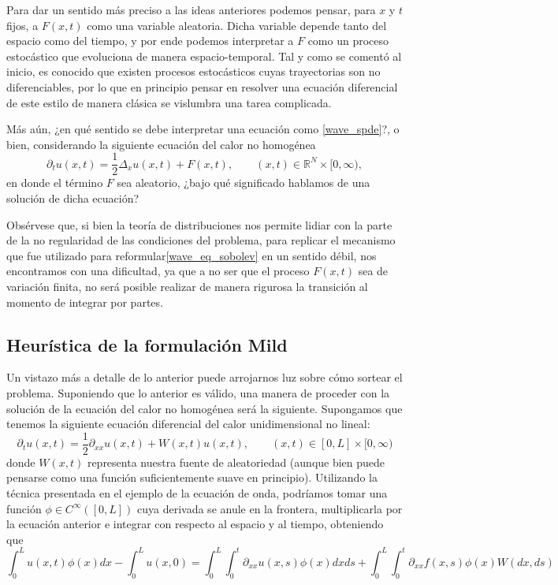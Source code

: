 \documentclass[letterpaper,twoside,12pt]{book}
\newcommand{\R}{\mathbb{R}}
\newcommand{\1}{\mathds{1}}
\theoremstyle{definition}
\theoremstyle{definition}
\theoremstyle{remark}
\theoremstyle{definition}
\theoremstyle{definition}
\theoremstyle{definition}
\theoremstyle{definition}
\theoremstyle{definition}
\begin{document}
Para dar un sentido más preciso a las ideas anteriores podemos pensar, para $x$ y $t$ fijos, a $F(x,t)$ como una variable aleatoria. Dicha variable depende tanto del espacio como del tiempo, y por ende podemos interpretar a $F$ como un proceso estocástico que evoluciona de manera espacio-temporal. Tal y como se comentó al inicio, es conocido que existen procesos estocásticos cuyas trayectorias son no diferenciables, por lo que en principio pensar en resolver una ecuación diferencial de este estilo de manera clásica se vislumbra una tarea complicada.

Más aún, ¿en qué sentido se debe interpretar una ecuación como \eqref{wave_spde}?, o bien, considerando la siguiente ecuación del calor no homogénea 
\begin{equation}\label{heat_spde}
    \partial_t{u(x,t)}=\frac{1}{2}\Delta_{x}u(x,t)+F(x,t), \qquad (x,t)\in \R^{N}\times[0,\infty),
\end{equation}
en donde el término $F$ sea aleatorio, ¿bajo qué significado hablamos de una solución de dicha ecuación?

Obsérvese que, si bien la teoría de distribuciones nos permite lidiar con la parte de la no regularidad de las condiciones del problema, para replicar el mecanismo que fue utilizado para reformular\eqref{wave_eq_sobolev} en un sentido débil, nos encontramos con una dificultad, ya que a no ser que el proceso $F(x,t)$ sea de variación finita, no será posible realizar de manera rigurosa la transición al momento de integrar por partes.

\subsection{Heurística de la formulación Mild}

Un vistazo más a detalle de lo anterior puede arrojarnos luz sobre cómo sortear el problema. Suponiendo que lo anterior es válido, una manera de proceder con la solución de la ecuación del calor no homogénea será la siguiente. Supongamos que tenemos la siguiente ecuación diferencial del calor unidimensional no lineal:
\[
\partial_tu(x,t)=\frac{1}{2}\partial_{xx}u(x,t)+W(x,t)u(x,t), \qquad (x,t)\in [0,L]\times [0,\infty) 
\]
donde $W(x,t)$ representa nuestra fuente de aleatoriedad (aunque bien puede pensarse como una función suficientemente suave en principio). Utilizando la técnica presentada en el ejemplo de la ecuación de onda, podríamos tomar una función $\phi \in C^{\infty}([0,L])$ cuya derivada se anule en la frontera, multiplicarla por la ecuación anterior e integrar con respecto al espacio y al tiempo, obteniendo que 
\[
\int_{0}^{L}u(x,t)\phi(x)dx-\int_{0}^{L}u(x,0)=\int_{0}^{L}\int_{0}^{t}\partial_{xx}u(x,s)\phi(x)dx ds+\int_{0}^{L}\int_{0}^{t}\partial_{xx}f(x,s)\phi(x)W(dx,ds)
\]
 
\end{document}
